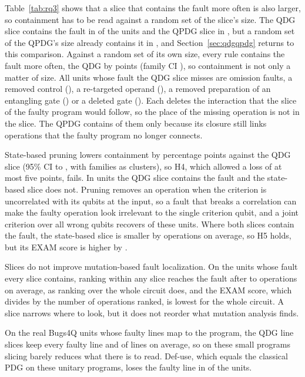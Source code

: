 Table~\ref{tab:rq3} shows that a slice that contains the fault more often is also larger, so containment has to be
read against a random set of the slice's size. The QDG slice contains the fault in \numRqThreeContainLc{} of the units
and the QPDG slice in \numRqThreeContainYz{}, but a random set of the QPDG's size already contains it in
\numSizeCtlYzRandom{}, and Section~\ref{sec:qdgqpdg} returns to this comparison. Against
a random set of its own size, every rule contains the fault more often, the QDG by \numSizeCtlLcGain{} points (family CI
\numSizeCtlLcGainCi{}), so containment is not only a matter of size. All \numLcMissTotal{} units whose fault the QDG
slice misses are omission faults, a removed control (\numLcMissCrm{}), a re-targeted operand (\numLcMissQsw{}), a
removed preparation of an entangling gate (\numLcMissEnt{}) or a deleted gate (\numLcMissDel{}). Each deletes the
interaction that the slice of the faulty program would follow, so the place of the missing operation is not in the
slice. The QPDG contains \numLcMissYzContained{} of them only because its closure still links operations that the faulty
program no longer connects.

State-based pruning lowers containment by \numHFourDiffAbs{} percentage points against the QDG slice (95\% CI
\numHFourCILow{} to \numHFourCIHigh{}, \numCcHFour{} with families as clusters), so H4, which allowed a loss of at most
five points, fails. In \numCQFour{} units the QDG slice contains the fault and the state-based slice does not. Pruning
removes an operation when the criterion is uncorrelated with its qubits at the input, so a fault that breaks a
correlation can make the faulty operation look irrelevant to the single criterion qubit, and a joint criterion over all
wrong qubits recovers \numCQFourRecovered{} of these units. Where both slices contain the fault, the state-based slice
is smaller by \numHFiveSizeDiff{} operations on average, so H5 holds, but its EXAM score is higher by
\numHFiveExamQHigher{}.

Slices do not improve mutation-based fault localization. On the \numMbflAllN{} units whose fault every slice contains,
ranking within any slice reaches the fault after \numMbflAllExaminedMin{} to \numMbflAllExaminedMax{} operations on
average, as ranking over the whole circuit does, and the EXAM score, which divides by the number of operations ranked,
is lowest for the whole circuit. A slice narrows where to look, but it does not reorder what mutation analysis finds.

On the \numLinesUnits{} real Bugs4Q units whose faulty lines map to the program, the QDG line slices keep every faulty
line and \numLinesLcMean{} of \numLinesFullMean{} lines on average, so on these small programs slicing barely reduces
what there is to read. Def-use, which equals the classical PDG on these unitary programs, loses the faulty line in
\numLinesDuMissed{} of the units.

